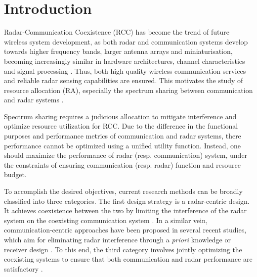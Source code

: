 \documentclass[a4paper,journal,10pt]{IEEEtran}
\begin{document}
\section{Introduction}
Radar-Communication Coexistence (RCC) has become the trend of future wireless system development, as both radar and communication systems develop towards higher frequency bands, larger antenna arrays and miniaturisation, becoming increasingly similar in hardware architectures, channel characteristics and signal processing \cite{hassanien2019dual,huang2015radar,cui2021integrating,liu2018mu}. Thus, both high quality wireless communication services and reliable radar sensing capabilities are ensured. This motivates the study of resource allocation (RA), especially the spectrum sharing between communication and radar systems \cite{9729765,9921194,10136774}.

Spectrum sharing requires a judicious allocation to mitigate interference and optimize resource utilization for RCC. Due to the difference in the functional purposes and performance metrics of communication and radar systems, there performance cannot be optimized using a unified utility function. Instead, one should maximize the performance of radar (resp. communication) system, under the constraints of ensuring communication (resp. radar) function and resource budget.

To accomplish the desired objectives, current research methods can be broadly classified into three categories. The first design strategy is a radar-centric design. It achieves coexistence between the two by limiting the interference of the radar system on the coexisting communication system \cite{aubry2015new,de2021joint}. In a similar vein, communication-centric approaches have been proposed in several recent studies, which aim for eliminating radar interference through a \textit{priori} knowledge or receiver design \cite{liu2018mimo,nartasilpa2018communications,wang2019power}. To this end, the third category involves jointly optimizing the coexisting systems to ensure that both communication and radar performance are satisfactory \cite{li2017joint,zheng2017joint,wang2019joint,yxtit2023}.
\end{document}
